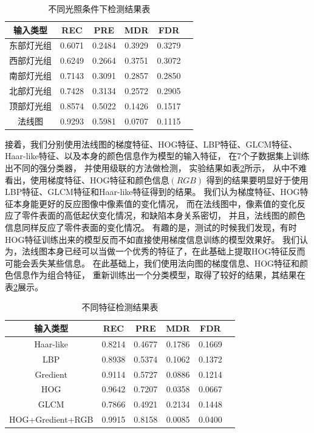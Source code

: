\begin{table}
\centering
\begin{tabular}{cccccp{38mm}}
\toprule
\textbf{输入类型} & \textbf{REC} & \textbf{PRE} & \textbf{MDR} & \textbf{FDR}\\
\midrule
\mbox{东部灯光组} & 0.6071 & 0.2484 & 0.3929 & 0.3279\\
\mbox{西部灯光组} & 0.6249 & 0.2664 & 0.3751 & 0.3072\\
\mbox{南部灯光组} & 0.7143 & 0.3091 & 0.2857 & 0.2850\\
\mbox{北部灯光组} & 0.7428 & 0.3134 & 0.2572 & 0.2905\\
\mbox{顶部灯光组} & 0.8574 & 0.5022 & 0.1426 & 0.1517\\
\mbox{法线图} & 0.9293 & 0.5981 & 0.0707 & 0.1115\\
\bottomrule
\end{tabular}
\caption{不同光照条件下检测结果表}
\label{tab:butongguanzhaojiancejieguo}
\end{table}

接着，我们分别使用法线图的梯度特征、HOG特征、LBP特征、GLCM特征、Haar-like特征、以及本身的颜色信息作为模型的输入特征，
在7个子数据集上训练出不同的强分类器，
并使用级联的方法做检测，
实验结果如表\ref{tab:butongtezhengjieguobiao}所示，
从中不难看出，使用梯度特征、HOG特征和颜色信息$(RGB)$
得到的结果要明显好于使用LBP特征、GLCM特征和Haar-like特征得到的结果。
我们认为梯度特征、HOG特征本身能更好的反应图像中像素值的变化情况，
而在法线图中，像素值的变化反应了零件表面的高低起伏变化情况，和缺陷本身关系密切，
并且，法线图的颜色信息同样反应了零件表面的变化情况。
有趣的是，测试的时候我们发现，有时HOG特征训练出来的模型反而不如直接使用梯度信息训练的模型效果好。
我们认为，法线图本身已经可以当做一个优秀的特征了，在此基础上提取HOG特征反而可能会丢失某些信息。
在此基础上，我们使用法向图的梯度信息、HOG特征和颜色信息作为组合特征，
重新训练出一个分类模型，取得了较好的结果，其结果在表\ref{tab:butongtezhengjieguobiao}展示。

\begin{table}
\centering
\begin{tabular}{cccccp{38mm}}
\toprule
\textbf{输入类型} & \textbf{REC} & \textbf{PRE} & \textbf{MDR} & \textbf{FDR}\\
\midrule
\mbox{Haar-like} & 0.8214 & 0.4677 & 0.1786 & 0.1669\\
\mbox{LBP} & 0.8938 & 0.5374 & 0.1062 & 0.1372\\
\mbox{Gredient} & 0.9114 & 0.5727 & 0.0886 & 0.1214\\
\mbox{HOG} & 0.9642 & 0.7207 & 0.0358 & 0.0667\\
\mbox{GLCM} & 0.7866 & 0.4921 & 0.2134 & 0.1448\\
\mbox{HOG+Gredient+RGB} & 0.9915 & 0.8158 & 0.0085 & 0.0400\\
\bottomrule
\end{tabular}
\caption{不同特征检测结果表}
\label{tab:butongtezhengjieguobiao}
\end{table}

